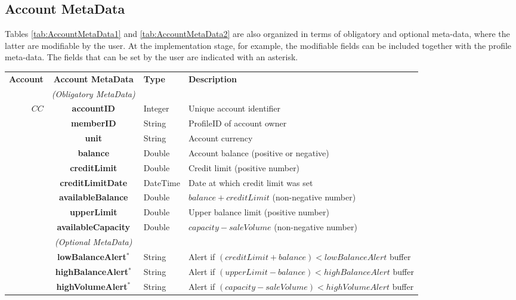 
\subsection{Account MetaData}
Tables \ref{tab:AccountMetaData1} and \ref{tab:AccountMetaData2} are also organized in terms of obligatory and optional meta-data, where the latter are modifiable by the user. At the implementation stage, for example, the modifiable fields can be included together with the profile meta-data. The fields that can be set by the user are indicated with an asterisk.

\begin{table}[H]
\begin{centering}
\small
{
\begin{tabular}{ r | c | l | l }
\hline
\textbf{Account}	& {\bf Account MetaData} & {\bf Type} & {\bf Description} \\
\Xhline{1.5pt}
			 & \emph{(Obligatory MetaData)}& & \\
\cline{2-2}
$CC$		& {\bf accountID}			&Integer	& Unique account identifier \\
			& {\bf memberID}			&String	& ProfileID of account owner \\
			& {\bf unit}					&String	& Account currency \\
			& {\bf balance}				&Double	& Account balance (positive or negative) \\
			& {\bf creditLimit}			&Double	& Credit limit (positive number) \\
			& {\bf creditLimitDate}		&DateTime & Date at which credit limit was set \\
			& {\bf availableBalance}		&Double	& $balance + creditLimit$ (non-negative number) \\
			& {\bf upperLimit}			&Double	& Upper balance limit (positive number) \\
			& {\bf availableCapacity}		&Double	& $capacity - saleVolume$ (non-negative number) \\
\cline{2-2}
			 & \emph{(Optional MetaData)}& & \\
\cline{2-2}
			& {\bf lowBalanceAlert$^*$}		&String	& Alert if $(creditLimit + balance) < lowBalanceAlert$ buffer \\
			& {\bf highBalanceAlert$^*$}		&String	& Alert if $(upperLimit - balance) < highBalanceAlert$ buffer \\
			& {\bf highVolumeAlert$^*$}		&String	& Alert if $(capacity - saleVolume) < highVolumeAlert$ buffer \\

\end{tabular}}
\end{centering}
\end{table}
